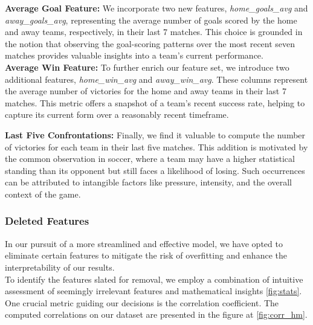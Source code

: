 \documentclass[a4paper,12pt]{article}
\begin{document}
\textbf{Average Goal Feature:}
We incorporate two new features, {\it home\_goals\_avg} and {\it away\_goals\_avg}, representing the average number of goals scored by the home and away teams, respectively, in their last 7 matches. This choice is grounded in the notion that observing the goal-scoring patterns over the most recent seven matches provides valuable insights into a team's current performance.\\

\textbf{Average Win Feature:}
To further enrich our feature set, we introduce two additional features, {\it home\_win\_avg} and {\it away\_win\_avg}. These columns represent the average number of victories for the home and away teams in their last 7 matches. This metric offers a snapshot of a team's recent success rate, helping to capture its current form over a reasonably recent timeframe.

\textbf{Last Five Confrontations:}
Finally, we find it valuable to compute the number of victories for each team in their last five matches. This addition is motivated by the common observation in soccer, where a team may have a higher statistical standing than its opponent but still faces a likelihood of losing. Such occurrences can be attributed to intangible factors like pressure, intensity, and the overall context of the game.


\subsubsection{Deleted Features}

In our pursuit of a more streamlined and effective model, we have opted to eliminate certain features to mitigate the risk of overfitting and enhance the interpretability of our results.\\

To identify the features slated for removal, we employ a combination of intuitive assessment of seemingly irrelevant features and mathematical insights \ref{fig:stats}. One crucial metric guiding our decisions is the correlation coefficient. The computed correlations on our dataset are presented in the figure at \ref{fig:corr_hm}.\\
\end{document}
